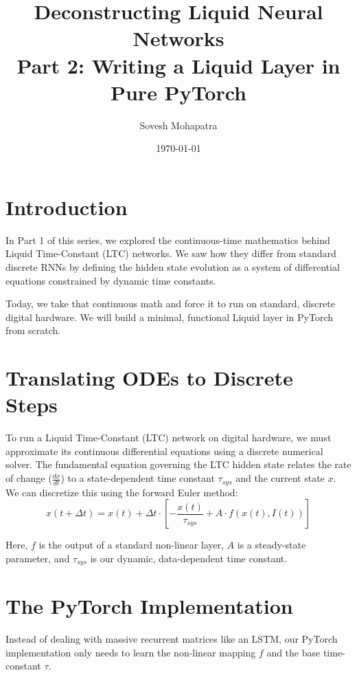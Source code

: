 \documentclass[12pt]{article}
\title{\textbf{Deconstructing Liquid Neural Networks \\ Part 2: Writing a Liquid Layer in Pure PyTorch}}
\author{Sovesh Mohapatra}
\date{\today}
\begin{document}
\maketitle

\section*{Introduction}
In Part 1 of this series, we explored the continuous-time mathematics behind Liquid Time-Constant (LTC) networks. We saw how they differ from standard discrete RNNs by defining the hidden state evolution as a system of differential equations constrained by dynamic time constants.

Today, we take that continuous math and force it to run on standard, discrete digital hardware. We will build a minimal, functional Liquid layer in PyTorch from scratch.

\section*{Translating ODEs to Discrete Steps}
To run a Liquid Time-Constant (LTC) network on digital hardware, we must approximate its continuous differential equations using a discrete numerical solver. The fundamental equation governing the LTC hidden state relates the rate of change ($\frac{dx}{dt}$) to a state-dependent time constant $\tau_{sys}$ and the current state $x$. We can discretize this using the forward Euler method:
\begin{equation}
x(t + \Delta t) = x(t) + \Delta t \cdot \left[ - \frac{x(t)}{\tau_{sys}} + A \cdot f(x(t), I(t)) \right]
\end{equation}

Here, $f$ is the output of a standard non-linear layer, $A$ is a steady-state parameter, and $\tau_{sys}$ is our dynamic, data-dependent time constant.

\section*{The PyTorch Implementation}
Instead of dealing with massive recurrent matrices like an LSTM, our PyTorch implementation only needs to learn the non-linear mapping $f$ and the base time-constant $\tau$.
\end{document}

